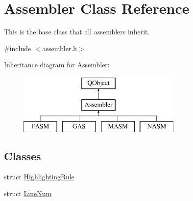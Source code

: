 \hypertarget{class_assembler}{}\section{Assembler Class Reference}
\label{class_assembler}


This is the base class that all assemblers inherit.  




{\ttfamily \#include $<$assembler.\+h$>$}

Inheritance diagram for Assembler\+:\begin{figure}[H]
\begin{center}
\leavevmode
\includegraphics[height=3.000000cm]{class_assembler}
\end{center}
\end{figure}
\subsection*{Classes}
\begin{DoxyCompactItemize}
\item 
struct \hyperlink{struct_assembler_1_1_highlighting_rule}{Highlighting\+Rule}
\item 
struct \hyperlink{struct_assembler_1_1_line_num}{Line\+Num}
\end{DoxyCompactItemize}
